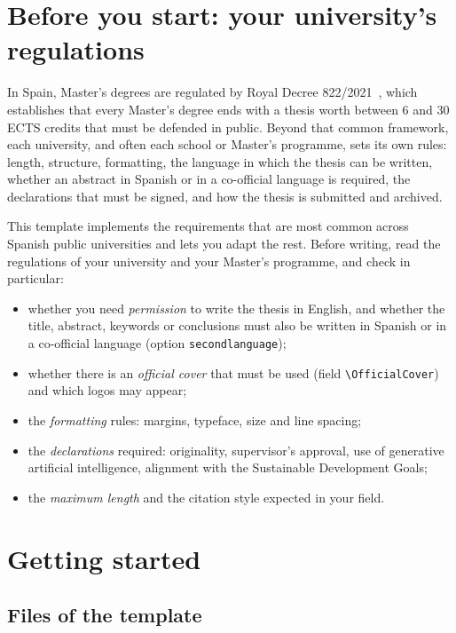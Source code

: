 \section{Before you start: your university's regulations}\label{sec:regulations}

In Spain, Master's degrees are regulated by Royal Decree 822/2021~\cite{rd822-2021}, which
establishes that every Master's degree ends with a thesis worth between 6 and 30 ECTS
credits that must be defended in public. Beyond that common framework, each university, and
often each school or Master's programme, sets its own rules: length, structure, formatting,
the language in which the thesis can be written, whether an abstract in Spanish or in a
co-official language is required, the declarations that must be signed, and how the thesis
is submitted and archived.

This template implements the requirements that are most common across Spanish public
universities and lets you adapt the rest. Before writing, read the regulations of your
university and your Master's programme, and check in particular:

\begin{itemize}
  \item whether you need \emph{permission} to write the thesis in English, and whether the
        title, abstract, keywords or conclusions must also be written in Spanish or in a
        co-official language (option \texttt{secondlanguage});
  \item whether there is an \emph{official cover} that must be used (field
        \texttt{\textbackslash OfficialCover}) and which logos may appear;
  \item the \emph{formatting} rules: margins, typeface, size and line spacing;
  \item the \emph{declarations} required: originality, supervisor's approval, use of
        generative artificial intelligence, alignment with the Sustainable Development
        Goals;
  \item the \emph{maximum length} and the citation style expected in your field.
\end{itemize}

\section{Getting started}\label{sec:getting-started}

\subsection{Files of the template}\label{sec:files}


